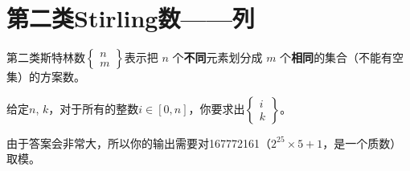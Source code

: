 \section{第二类Stirling数——列}
\par \noindent 第二类斯特林数$\begin{Bmatrix} n \\m \end{Bmatrix}$表示把 $n$ 个\textbf{不同}元素划分成 $m$ 个\textbf{相同}的集合（不能有空集）的方案数。
~\\
\par \noindent 给定$n$, $k$，对于所有的整数$i\in[0,n]$，你要求出$\begin{Bmatrix} i \\k \end{Bmatrix}$。
~\\
\par \noindent 由于答案会非常大，所以你的输出需要对167772161（$2^{25}\times 5+1$，是一个质数）取模。
